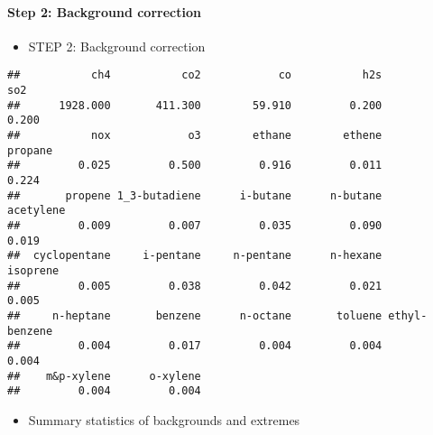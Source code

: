 \documentclass[
]{article}
\providecommand{\tightlist}{%
  \setlength{\itemsep}{0pt}\setlength{\parskip}{0pt}}
\begin{document}
\paragraph{Step 2: Background
correction}\label{step-2-background-correction}

\begin{itemize}
\tightlist
\item
  STEP 2: Background correction
\end{itemize}

\begin{verbatim}
##           ch4           co2            co           h2s           so2 
##      1928.000       411.300        59.910         0.200         0.200 
##           nox            o3        ethane        ethene       propane 
##         0.025         0.500         0.916         0.011         0.224 
##       propene 1_3-butadiene      i-butane      n-butane     acetylene 
##         0.009         0.007         0.035         0.090         0.019 
##  cyclopentane     i-pentane     n-pentane      n-hexane      isoprene 
##         0.005         0.038         0.042         0.021         0.005 
##     n-heptane       benzene      n-octane       toluene ethyl-benzene 
##         0.004         0.017         0.004         0.004         0.004 
##    m&p-xylene      o-xylene 
##         0.004         0.004
\end{verbatim}

\begin{itemize}
\tightlist
\item
  Summary statistics of backgrounds and extremes
\end{itemize}
\end{document}
